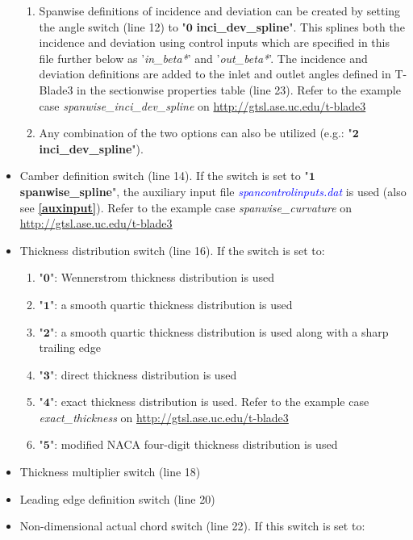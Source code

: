 \documentclass[8pt]{article}
\begin{document}
\begin{itemize}[leftmargin=*]
\begin{enumerate}[label=\alph*]
        \item Spanwise definitions of incidence and deviation can be created by setting the angle switch (line 12) to "$\mathbf{0}$ \textbf{inci\_dev\_spline}". This splines both the incidence and deviation using control inputs which are specified in this file further below as '\textit{in\_beta*}' and '\textit{out\_beta*}'. The incidence and deviation definitions are added to the inlet and outlet angles defined in T-Blade3 in the sectionwise properties table (line 23). Refer to the example case \textit{spanwise\_inci\_dev\_spline} on \url{http://gtsl.ase.uc.edu/t-blade3}
        \item Any combination of the two options can also be utilized (e.g.: "$\mathbf{2}$ \textbf{inci\_dev\_spline}"). 
    \end{enumerate}
    \item Camber definition switch (line 14). If the switch is set to "$\mathbf{1}$ \textbf{spanwise\_spline}", the auxiliary input file \textit{\textcolor{blue}{spancontrolinputs.dat}} is used (also see \textbf{\ref{auxinput}}). Refer to the example case \textit{spanwise\_curvature} on \url{http://gtsl.ase.uc.edu/t-blade3}
    \item Thickness distribution switch (line 16). If the switch is set to:
    \begin{enumerate}[label=\alph*]
        \item "$\mathbf{0}$": Wennerstrom thickness distribution is used
        \item "$\mathbf{1}$": a smooth quartic thickness distribution is used
        \item "$\mathbf{2}$": a smooth quartic thickness distribution is used along with a sharp trailing edge
        \item "$\mathbf{3}$": direct thickness distribution is used 
        \item "$\mathbf{4}$": exact thickness distribution is used. Refer to the example case \textit{exact\_thickness} on \url{http://gtsl.ase.uc.edu/t-blade3}
        \item "$\mathbf{5}$": modified NACA four-digit thickness distribution is used
    \end{enumerate}
    \item Thickness multiplier switch (line 18)
    \item Leading edge definition switch (line 20)
    \item Non-dimensional actual chord switch (line 22). If this switch is set to:
    \begin{enumerate}[label=\alph*]

\end{enumerate}
\end{itemize}
\end{document}
